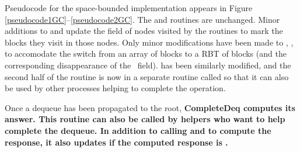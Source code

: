 
Pseudocode for the space-bounded implementation appears in Figure \ref{pseudocode1GC}--\ref{pseudocode2GC}.
The  and  routines are unchanged.
Minor additions to  and  update the  field of nodes
visited by the routines to mark the blocks they visit in those nodes.
Only minor modifications have been made to , , 
to accomodate the switch from an array of blocks to a RBT of blocks (and the corresponding disappearance
of the \head\ field).
 has been similarly modified, and the second half of the routine is now in a
separate routine called  so that it can also be used by other processes
helping to complete the operation.

Once a dequeue has been propagated to the root, 
\bf{\op CompleteDeq} computes its answer.  This routine can also be called by helpers 
who want to help complete the dequeue.
In addition to calling  and  to compute the response,
it also updates  if the computed response is \nl.




\renewcommand{\algorithmiccomment}[1]{\hfill\eqparbox{COMMENTDOUBLE}{\com\ #1}}

